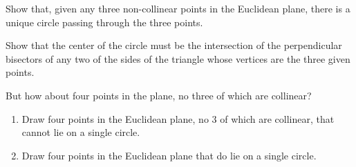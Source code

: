 \documentclass{ximera}
\begin{document}
\begin{problem}
Show that, given any three non-collinear points in the Euclidean
plane, there is a unique circle passing through the three points.

\begin{hint}
Show that the center of the circle must be the intersection of
the perpendicular bisectors of any two of the sides of the triangle
whose vertices are the three given points.
\end{hint}
\end{problem}

But how about four points in the plane, no three of which are
collinear?

\begin{problem}
\begin{enumerate}\hfil
\item Draw four points in the Euclidean plane, no $3$ of which are collinear, that cannot lie on a single circle.
\item Draw four points in the Euclidean plane that do lie on a single
circle.
\end{enumerate}
\end{problem}
\end{document}
